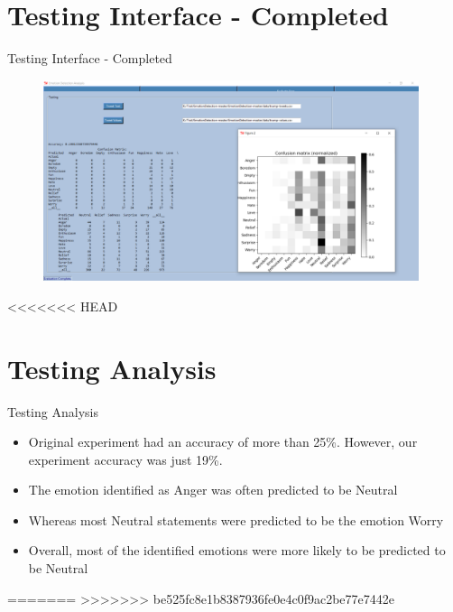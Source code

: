 \documentclass{beamer}
\begin{document}
\section{Testing Interface - Completed}
\begin{frame}{Testing Interface - Completed}
\begin{figure}[H]
\centering
\includegraphics[width=110mm]{TestingGUI-Complete.png}
\end{figure}
\end{frame}

<<<<<<< HEAD
\section{Testing Analysis}
\begin{frame}{Testing Analysis}
\begin{itemize}
\item Original experiment had an accuracy of more than 25\%. However, our experiment accuracy was just 19\%.
\item The emotion identified as Anger was often predicted to be Neutral 
\item Whereas most Neutral statements were predicted to be the emotion Worry
\item Overall, most of the identified emotions were more likely to be predicted to be Neutral
\end{itemize}
\end{frame}

=======
>>>>>>> be525fc8e1b8387936fe0e4c0f9ac2be77e7442e
\end{document}
